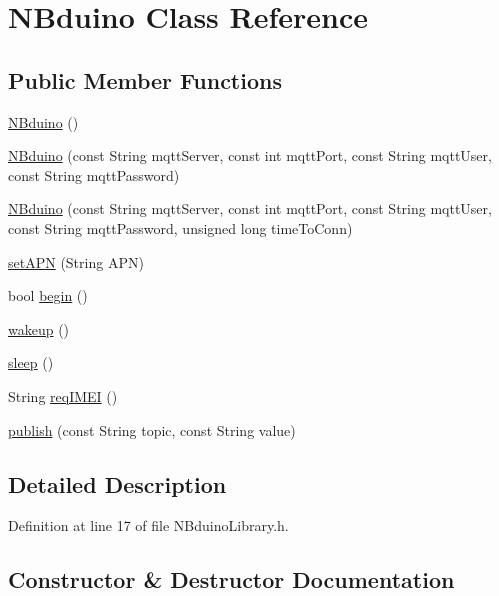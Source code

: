 \hypertarget{class_n_bduino}{}\section{N\+Bduino Class Reference}
\label{class_n_bduino}
\subsection*{Public Member Functions}
\begin{DoxyCompactItemize}
\item 
\mbox{\hyperlink{class_n_bduino_acd7c1c69bffccefc807ff89394732a7d}{N\+Bduino}} ()
\item 
\mbox{\hyperlink{class_n_bduino_af520a0691a464694c224aba7bd1b81f6}{N\+Bduino}} (const String mqtt\+Server, const int mqtt\+Port, const String mqtt\+User, const String mqtt\+Password)
\item 
\mbox{\hyperlink{class_n_bduino_ac3902de83e4e090b90a984d7fd9fd148}{N\+Bduino}} (const String mqtt\+Server, const int mqtt\+Port, const String mqtt\+User, const String mqtt\+Password, unsigned long time\+To\+Conn)
\item 
\mbox{\hyperlink{class_n_bduino_a9a903295305e847b3d68a7a6cc111316}{set\+A\+PN}} (String A\+PN)
\item 
bool \mbox{\hyperlink{class_n_bduino_ae8241f6dcfe492f00f8bef4b5d4b79a0}{begin}} ()
\item 
\mbox{\hyperlink{class_n_bduino_a8e740e7b90e6e75b7dd3b7900ee0dd22}{wakeup}} ()
\item 
\mbox{\hyperlink{class_n_bduino_ac7bf8f7f0552ad2cbda4b3e91a82bfca}{sleep}} ()
\item 
String \mbox{\hyperlink{class_n_bduino_a3d96fbfb52c89cd55e9a7a3f387c6945}{req\+I\+M\+EI}} ()
\item 
\mbox{\hyperlink{class_n_bduino_a1c9526fbb36956b1cd41e33dd9133394}{publish}} (const String topic, const String value)
\end{DoxyCompactItemize}


\subsection{Detailed Description}


Definition at line 17 of file N\+Bduino\+Library.\+h.



\subsection{Constructor \& Destructor Documentation}
\mbox{\label{class_n_bduino_acd7c1c69bffccefc807ff89394732a7d}} 
